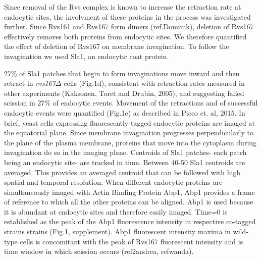 \documentclass[9pt,lineno]{elife}
\begin{document}
 Since removal of the Rvs complex is known to increase the retraction rate at endocytic sites, the involvment of these proteins in the process was investigated further. Since Rvs161 and Rvs167 form dimers (ref.Dominik), deletion of Rvs167 effectively removes both proteins from endocytic sites. We therefore quantified the effect of deletion of Rvs167 on membrane invagination. To follow the invagination we used Sla1, an endocytic coat protein. 


27\% of Sla1 patches that begin to form invaginations move inward and then retract in \textit{rvs167$\Delta$} cells (Fig.1d), consistent with retraction rates measured in other experiments (Kaksonen, Toret and Drubin, 2005), and suggesting failed scission in 27\% of endocytic events. Movement of the retractions and of successful endocytic events were quantified (Fig.1e) as described in Picco et. al, 2015. In brief, yeast cells expressing fluorescently-tagged endocytic proteins are imaged at the equatorial plane. Since membrane invagination progresses perpendicularly to the plane of the plasma membrane, proteins that move into the cytoplasm during invagination do so in the imaging plane. Centroids of Sla1 patches- each patch being an endocytic site- are tracked in time. Between 40-50 Sla1 centroids are averaged. This provides an averaged centroid that can be followed with high spatial and temporal resolution. When different endocytic proteins are simultaneously imaged with Actin Binding Protein Abp1, Abp1 provides a frame of reference to which all the other proteins can be aligned. Abp1 is used because it is abundant at endocytic sites and therefore easily imaged. Time=0 is established as the peak of the Abp1 fluorescence intensity in respective co-tagged strains strains (Fig.1, supplement). Abp1 fluorescent intensity maxima in wild-type cells is concomitant with the peak of Rvs167 fluorescent intensity and is time window in which scission occurs (ref2andrea, refwanda). 
\end{document}
